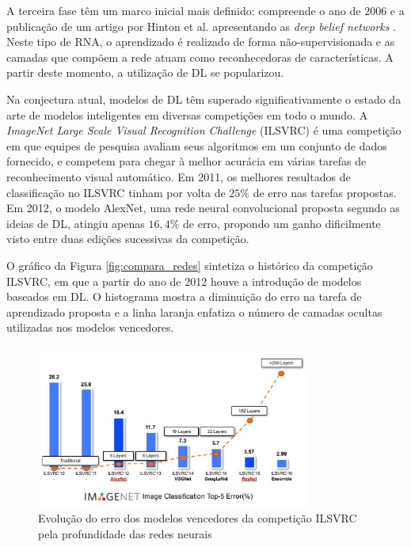 A terceira fase têm um marco inicial mais definido: compreende o ano de $2006$ e a publicação de um artigo por Hinton et al. apresentando as \emph{deep belief networks} \cite{hinton2006fast}. Neste tipo de RNA, o aprendizado é realizado de forma não-supervisionada e as camadas que compõem a rede atuam como reconhecedoras de características. A partir deste momento, a utilização de DL se popularizou.

Na conjectura atual, modelos de DL têm superado significativamente o estado da arte de modelos inteligentes em diversas competições em todo o mundo. A \emph{ImageNet Large Scale Visual Recognition Challenge} (ILSVRC) é uma competição em que equipes de pesquisa avaliam seus algoritmos em um conjunto de dados fornecido, e competem para chegar à melhor acurácia em várias tarefas de reconhecimento visual automático. Em 2011, os melhores resultados de  classificação no ILSVRC tinham por volta de $25\%$ de erro nas tarefas propostas. Em 2012, o modelo AlexNet, uma rede neural convolucional proposta segundo as ideias de DL, atingiu apenas $16,4\%$ de erro, propondo um ganho dificilmente visto entre duas edições sucessivas da competição.

O gráfico da Figura \ref{fig:compara_redes} sintetiza o histórico da competição ILSVRC, em que a partir do ano de 2012 houve a introdução de modelos baseados em DL. O histograma mostra a diminuição do erro na tarefa de aprendizado proposta e a linha laranja enfatiza o número de camadas ocultas utilizadas nos modelos vencedores.

\begin{figure}[ht]
	\centering
	\caption{Evolução do erro dos modelos vencedores da competição ILSVRC pela profundidade das redes neurais \cite{dl_ILSVRC}}
	\label{fig:compara_redes_ilsvrc}
	\includegraphics[width=0.8\textwidth]{img/compara_redes_ilsvrc.png}
\end{figure}


